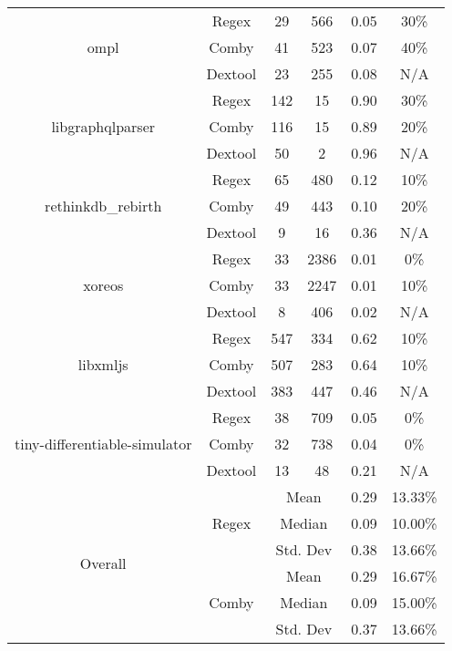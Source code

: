 \documentclass[sigconf,review, anonymous]{acmart}
\begin{document}
{\begin{table}[htbp]
{\begin{tabular}{|c|c|c|c|c|c|}
 \multirow{3}{*}{\small ompl} & Regex & 29 & 566 & 0.05 & 30\% \\\cline{2-6}
    & Comby & 41 & 523 & 0.07 & 40\% \\\cline{2-6}
    & Dextool & 23 & 255 & 0.08 & N/A \\ \hline
\multirow{3}{*}{\small libgraphqlparser} & Regex & 142 & 15 & 0.90 & 30\% \\\cline{2-6}
    & Comby & 116 & 15 & 0.89 & 20\% \\ \cline{2-6}
    & Dextool & 50 & 2 & 0.96 & N/A \\ \hline
\multirow{3}{*}{\small rethinkdb\_rebirth} & Regex & 65 & 480 & 0.12 & 10\% \\\cline{2-6}
    & Comby & 49 & 443 & 0.10 & 20\% \\ \cline{2-6}
    & Dextool & 9 & 16 & 0.36 & N/A \\ \hline
    
\multirow{3}{*}{\small xoreos} & Regex & 33 & 2386 & 0.01 & 0\% \\\cline{2-6}
    & Comby & 33 & 2247 & 0.01 & 10\% \\ \cline{2-6}
    & Dextool & 8 & 406 & 0.02 & N/A \\ \hline
\multirow{3}{*}{\small libxmljs} & Regex & 547 & 334 & 0.62 & 10\% \\\cline{2-6}
    & Comby & 507 & 283 & 0.64 & 10\% \\ \cline{2-6}
    & Dextool & 383 & 447 & 0.46 & N/A \\ \hline
\multirow{3}{*}{\small tiny-differentiable-simulator} & Regex & 38 & 709 & 0.05 & 0\% \\\cline{2-6}
    & Comby & 32 & 738 & 0.04 & 0\% \\ \cline{2-6}
    & Dextool & 13 & 48 & 0.21 & N/A\\ \hline
    
\multirow{9}{*}{Overall} & \multirow{3}{*}{Regex} & \multicolumn{2}{c|}{Mean} & 0.29  & 13.33\%\\\cline{3-6}
    &   &  \multicolumn{2}{c|}{Median} & 0.09 & 10.00\% \\\cline{3-6}
    &   &  \multicolumn{2}{c|}{Std. Dev} & 0.38 & 13.66\% \\\cline{2-6}

 & \multirow{3}{*}{Comby} & \multicolumn{2}{c|}{Mean} & 0.29 & 16.67\% \\\cline{3-6}
    &   &  \multicolumn{2}{c|}{Median} & 0.09 & 15.00\% \\\cline{3-6}
    &   &  \multicolumn{2}{c|}{Std. Dev} & 0.37 & 13.66\% \\\cline{2-6}


\end{tabular}}
\end{table}}
\end{document}
